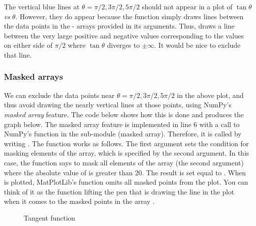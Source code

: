 \documentclass[letterpaper,10pt,english]{sphinxmanual}
\begin{document}
The vertical blue lines at \(\theta = \pi/2, 3\pi/2, 5\pi/2\) should not appear in a plot of \(\tan\theta\) \emph{vs} \(\theta\).  However, they do appear because the  function simply draws lines between the data points in the - arrays provided in its arguments.  Thus,  draws a line between the very large positive and negative  values corresponding to the  values on either side of \(\pi/2\) where \(\tan\theta\) diverges to \(\pm\infty\).  It would be nice to exclude that line.


\subsubsection{Masked arrays}
\label{chap5/chap5_plot:masked-arrays}
We can exclude the data points near \(\theta = \pi/2, 3\pi/2, 5\pi/2\) in the above plot, and thus avoid drawing the nearly vertical lines at those points, using NumPy's \emph{masked array} feature.  The code below shows how this is done and produces the graph below.  The masked array feature is implemented in line 6 with a call to NumPy's  function in the sub-module  (masked array).  Therefore, it is called by writing .  The  function works as follows.  The first argument sets the condition for masking elements of the array, which is specified by the second argument.  In this case, the function says to mask all elements of the array  (the second argument) where the absolute value of  is greater than 20.  The result is set equal to .  When  is plotted, MatPlotLib's  function omits all masked points from the plot.  You can think of it as the  function lifting the pen that is drawing the line in the plot when it comes to the masked points in the array .
\begin{figure}[htbp]
\centering
\capstart

\caption{Tangent function}\label{chap5/chap5_plot:fig-plotlimits3}\end{figure}
\end{document}
